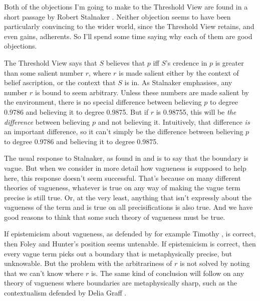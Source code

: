 Both of the objections I'm going to make to the Threshold View are found in a short passage by Robert Stalnaker \citeyearpar[91]{Stalnaker1984}. Neither objection seems to have been particularly convincing to the wider world, since the Threshold View retains, and even gains, adherents. So I'll spend some time saying why each of them are good objections.

The Threshold View says that  \(S\) believes that \(p\) iff \(S\)'s credence in \(p\) is greater than some salient number \(r\), where \(r\) is made salient either by the context of belief ascription, or the context that \(S\) is in. As Stalnaker emphasises, any number \(r\) is bound to seem arbitrary. Unless these numbers are made salient by the environment, there is no special difference between believing \(p\) to degree 0.9786 and believing it to degree 0.9875. But if \(r\) is 0.98755, this will be \textit{the difference} between believing \(p\) and not believing it. Intuitively, that difference \textit{is} an important difference, so it can't simply be the difference between believing \(p\) to degree 0.9786 and believing it to degree 0.9875.

The usual response to Stalnaker, as found in \citet[Ch. 4]{Foley1993} and \cite{Hunter1996} is to say that the boundary is vague. But when we consider in more detail how vagueness is supposed to help here, this response doesn't seem successful. That's because on many different theories of vagueness, whatever is true on any way of making the vague term precise is still true. Or, at the very least, anything that isn't expressly about the vagueness of the term and is true on all precisifications is also true. And we have good reasons to think that some such theory of vagueness must be true.

If epistemicism about vagueness, as defended by for example Timothy \cite{Williamson1994-WILV}, is correct, then Foley and Hunter's position seems untenable. If epistemicism is correct, then every vague term picks out a boundary that is metaphysically precise, but unknowable. But the problem with the arbitrariness of \(r\) is not solved by noting that we can't know where \(r\) is. The same kind of conclusion will follow on any theory of vagueness where boundaries are metaphysically sharp, such as the contextualism defended by Delia Graff \cite{Fara2000}.

